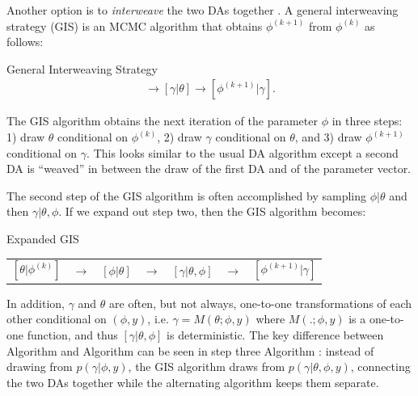 \documentclass[12pt]{article}
\begin{document}
Another option is to {\it interweave} the two DAs together \cite{yu2011center}. A general interweaving strategy (GIS) is an MCMC algorithm that obtains $\phi^{(k+1)}$ from $\phi^{(k)}$ as follows:
\begin{alg*}[GIS]General Interweaving Strategy\label{alg:GIS}
  \begin{align*}
    [\theta|\phi^{(k)}] \to [\gamma|\theta] \to [\phi^{(k+1)}|\gamma].
  \end{align*}
\end{alg*}
\noindent The GIS algorithm obtains the next iteration of the parameter $\phi$ in three steps: 1) draw $\theta$ conditional on $\phi^{(k)}$, 2) draw $\gamma$ conditional on $\theta$, and 3) draw $\phi^{(k+1)}$ conditional on $\gamma$. This looks similar to the usual DA algorithm except a second DA is ``weaved'' in between the draw of the first DA and of the parameter vector. 

The second step of the GIS algorithm is often accomplished by sampling $\phi|\theta$ and then $\gamma|\theta,\phi$. If we expand out step two, then the GIS algorithm becomes:
\begin{alg*}[eGIS]Expanded GIS\label{alg:GIS2}
  \begin{center}
    \begin{tabular}{lllllll}
      $[\theta|\phi^{(k)}]$& $\to$& $[\phi|\theta]$& $\to $&$[\gamma|\theta,\phi]$& $\to$& $[\phi^{(k+1)}|\gamma]$
    \end{tabular}
  \end{center}
\end{alg*}
\noindent
In addition, $\gamma$ and $\theta$ are often, but not always, one-to-one transformations of each other conditional on $(\phi,y)$, i.e. $\gamma = M(\theta;\phi,y)$ where $M(.;\phi,y)$ is a one-to-one function, and thus $[\gamma|\theta,\phi]$ is deterministic.
The key difference between Algorithm  and Algorithm  can be seen in step three Algorithm : instead of drawing from $p(\gamma|\phi,y)$, the GIS algorithm draws from $p(\gamma|\theta,\phi,y)$, connecting the two DAs together while the alternating algorithm keeps them separate.
\end{document}
